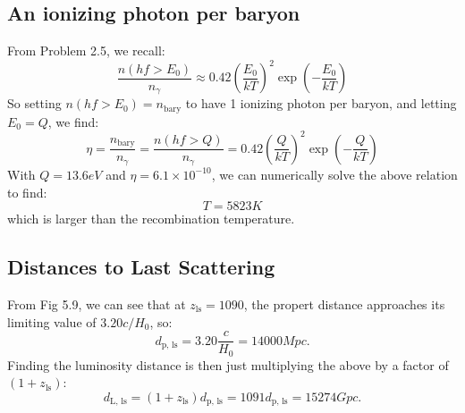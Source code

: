 \subsection{An ionizing photon per baryon}
From Problem 2.5, we recall:
\begin{equation}
    \frac{n(hf > E_0)}{n_\gamma} \approx 0.42\left(\frac{E_0}{kT}\right)^2\exp(-\frac{E_0}{kT})
\end{equation}
So setting $n(hf > E_0) = n_{\text{bary}}$ to have 1 ionizing photon per baryon, and letting $E_0 = Q$, we find:
\begin{equation}
    \eta = \frac{n_{\text{bary}}}{n_{\gamma}} = \frac{n(hf > Q)}{n_\gamma} = 0.42\left(\frac{Q}{kT}\right)^2\exp(-\frac{Q}{kT})
\end{equation}
With $Q = 13.6\si{eV}$ and $\eta = 6.1 \times 10^{-10}$, we can numerically solve the above relation to find:
\begin{equation}
    \boxed{T = 5823\si{K}}
\end{equation}
which is larger than the recombination temperature.

\subsection{}

\subsection{Distances to Last Scattering}
From Fig 5.9, we can see that at $z_{\text{ls}} = 1090$, the propert distance approaches its limiting value of $3.20c/H_0$, so:
\begin{equation}
    \boxed{d_{\text{p, ls}} = 3.20\frac{c}{H_0} = 14000\si{Mpc}}.
\end{equation}
Finding the luminosity distance is then just multiplying the above by a factor of $(1 + z_{\text{ls}})$:
\begin{equation}
    \boxed{d_{\text{L, ls}} = (1 + z_{\text{ls}})d_{\text{p, ls}} = 1091d_{\text{p, ls}} = 15274\si{Gpc}}.
\end{equation}